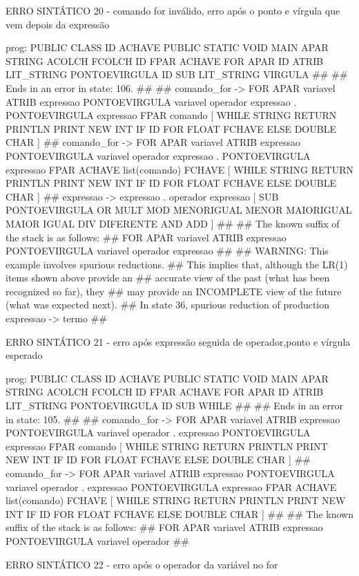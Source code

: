 \documentclass[12pt,a4paper,twoside]{report}
\begin{document}
\begin{terminal}
ERRO SINTÁTICO 20 -  comando for inválido, erro após o ponto e vírgula que vem depois da expressão

prog: PUBLIC CLASS ID ACHAVE PUBLIC STATIC VOID MAIN APAR STRING ACOLCH FCOLCH ID FPAR ACHAVE FOR APAR ID ATRIB LIT_STRING PONTOEVIRGULA ID SUB LIT_STRING VIRGULA 
##
## Ends in an error in state: 106.
##
## comando_for -> FOR APAR variavel ATRIB expressao PONTOEVIRGULA variavel operador expressao . PONTOEVIRGULA expressao FPAR comando [ WHILE STRING RETURN PRINTLN PRINT NEW INT IF ID FOR FLOAT FCHAVE ELSE DOUBLE CHAR ]
## comando_for -> FOR APAR variavel ATRIB expressao PONTOEVIRGULA variavel operador expressao . PONTOEVIRGULA expressao FPAR ACHAVE list(comando) FCHAVE [ WHILE STRING RETURN PRINTLN PRINT NEW INT IF ID FOR FLOAT FCHAVE ELSE DOUBLE CHAR ]
## expressao -> expressao . operador expressao [ SUB PONTOEVIRGULA OR MULT MOD MENORIGUAL MENOR MAIORIGUAL MAIOR IGUAL DIV DIFERENTE AND ADD ]
##
## The known suffix of the stack is as follows:
## FOR APAR variavel ATRIB expressao PONTOEVIRGULA variavel operador expressao 
##
## WARNING: This example involves spurious reductions.
## This implies that, although the LR(1) items shown above provide an
## accurate view of the past (what has been recognized so far), they
## may provide an INCOMPLETE view of the future (what was expected next).
## In state 36, spurious reduction of production expressao -> termo 
##

ERRO SINTÁTICO 21 -  erro após expressão seguida de operador,ponto e vírgula esperado

prog: PUBLIC CLASS ID ACHAVE PUBLIC STATIC VOID MAIN APAR STRING ACOLCH FCOLCH ID FPAR ACHAVE FOR APAR ID ATRIB LIT_STRING PONTOEVIRGULA ID SUB WHILE 
##
## Ends in an error in state: 105.
##
## comando_for -> FOR APAR variavel ATRIB expressao PONTOEVIRGULA variavel operador . expressao PONTOEVIRGULA expressao FPAR comando [ WHILE STRING RETURN PRINTLN PRINT NEW INT IF ID FOR FLOAT FCHAVE ELSE DOUBLE CHAR ]
## comando_for -> FOR APAR variavel ATRIB expressao PONTOEVIRGULA variavel operador . expressao PONTOEVIRGULA expressao FPAR ACHAVE list(comando) FCHAVE [ WHILE STRING RETURN PRINTLN PRINT NEW INT IF ID FOR FLOAT FCHAVE ELSE DOUBLE CHAR ]
##
## The known suffix of the stack is as follows:
## FOR APAR variavel ATRIB expressao PONTOEVIRGULA variavel operador 
##

ERRO SINTÁTICO 22 -  erro após o operador da variável no for


\end{terminal}
\end{document}
